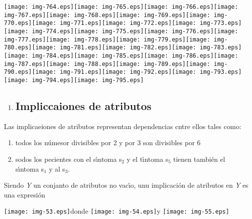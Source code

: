 \documentclass[12pt]{article}
\begin{document}
\texttt{[image: img-764.eps]}\texttt{[image: img-765.eps]}\texttt{[image: img-766.eps]}\texttt{[image: img-767.eps]}\texttt{[image: img-768.eps]}\texttt{[image: img-769.eps]}\texttt{[image: img-770.eps]}\texttt{[image: img-771.eps]}\texttt{[image: img-772.eps]}\texttt{[image: img-773.eps]}\texttt{[image: img-774.eps]}\texttt{[image: img-775.eps]}\texttt{[image: img-776.eps]}\texttt{[image: img-777.eps]}\texttt{[image: img-778.eps]}\texttt{[image: img-779.eps]}\texttt{[image: img-780.eps]}\texttt{[image: img-781.eps]}\texttt{[image: img-782.eps]}\texttt{[image: img-783.eps]}\texttt{[image: img-784.eps]}\texttt{[image: img-785.eps]}\texttt{[image: img-786.eps]}\texttt{[image: img-787.eps]}\texttt{[image: img-788.eps]}\texttt{[image: img-789.eps]}\texttt{[image: img-790.eps]}\texttt{[image: img-791.eps]}\texttt{[image: img-792.eps]}\texttt{[image: img-793.eps]}\texttt{[image: img-794.eps]}\texttt{[image: img-795.eps]}
\begin{enumerate}
	\item \subsection{Impliccaiones de atributos}
\end{enumerate}

Las implicaeiones de atributos representan dependencias cntre ellos tales como:

\begin{enumerate}
	\item todos los n\'{u}mesor divisibles por 2 y por 3 son divisibles por 6
	\item sodos los pecientes con el s\'{\i}ntoma s$_{2}$ y el t\'{\i}ntoma s$_{5}$ tienen
tambi\'{e}n el s\'{\i}ntoma s$_{1}$ y al s$_{3}$.
\end{enumerate}

Siendo \textit{Y} un conjanto de atributos no vac\'{\i}o, unu implicaci\'{o}n de
atributos en \textit{Y} es una expresi\'{o}n

\begin{center}
\texttt{[image: img-53.eps]}donde
\texttt{[image: img-54.eps]}y
\texttt{[image: img-55.eps]}
\end{center}
\end{document}
